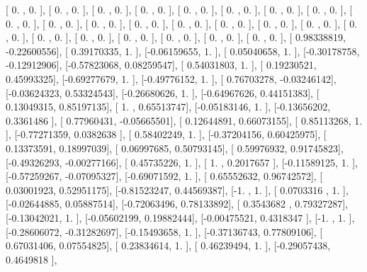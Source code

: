 \documentclass{article}
\begin{document}
       [ 0.        ,  0.        ],
       [ 0.        ,  0.        ],
       [ 0.        ,  0.        ],
       [ 0.        ,  0.        ],
       [ 0.        ,  0.        ],
       [ 0.        ,  0.        ],
       [ 0.        ,  0.        ],
       [ 0.        ,  0.        ],
       [ 0.        ,  0.        ],
       [ 0.        ,  0.        ],
       [ 0.        ,  0.        ],
       [ 0.        ,  0.        ],
       [ 0.        ,  0.        ],
       [ 0.        ,  0.        ],
       [ 0.        ,  0.        ],
       [ 0.        ,  0.        ],
       [ 0.        ,  0.        ],
       [ 0.        ,  0.        ],
       [ 0.        ,  0.        ],
       [ 0.        ,  0.        ],
       [ 0.        ,  0.        ],
       [ 0.        ,  0.        ],
       [ 0.        ,  0.        ],
       [ 0.98338819, -0.22600556],
       [ 0.39170335,  1.        ],
       [-0.06159655,  1.        ],
       [ 0.05040658,  1.        ],
       [-0.30178758, -0.12912906],
       [-0.57823068,  0.08259547],
       [ 0.54031803,  1.        ],
       [ 0.19230521,  0.45993325],
       [-0.69277679,  1.        ],
       [-0.49776152,  1.        ],
       [ 0.76703278, -0.03246142],
       [-0.03624323,  0.53324543],
       [-0.26680626,  1.        ],
       [-0.64967626,  0.44151383],
       [ 0.13049315,  0.85197135],
       [ 1.        ,  0.65513747],
       [-0.05183146,  1.        ],
       [-0.13656202,  0.3361486 ],
       [ 0.77960431, -0.05665501],
       [ 0.12644891,  0.66073155],
       [ 0.85113268,  1.        ],
       [-0.77271359,  0.0382638 ],
       [ 0.58402249,  1.        ],
       [-0.37204156,  0.60425975],
       [ 0.13373591,  0.18997039],
       [ 0.06997685,  0.50793145],
       [ 0.59976932,  0.91745823],
       [-0.49326293, -0.00277166],
       [ 0.45735226,  1.        ],
       [ 1.        ,  0.2017657 ],
       [-0.11589125,  1.        ],
       [-0.57259267, -0.07095327],
       [-0.69071592,  1.        ],
       [ 0.65552632,  0.96742572],
       [ 0.03001923,  0.52951175],
       [-0.81523247,  0.44569387],
       [-1.        ,  1.        ],
       [ 0.0703316 ,  1.        ],
       [-0.02644885,  0.05887514],
       [-0.72063496,  0.78133892],
       [ 0.3543682 ,  0.79327287],
       [-0.13042021,  1.        ],
       [-0.05602199,  0.19882444],
       [-0.00475521,  0.4318347 ],
       [-1.        ,  1.        ],
       [-0.28606072, -0.31282697],
       [-0.15493658,  1.        ],
       [-0.37136743,  0.77809106],
       [ 0.67031406,  0.07554825],
       [ 0.23834614,  1.        ],
       [ 0.46239494,  1.        ],
       [-0.29057438,  0.4649818 ],
\end{document}

